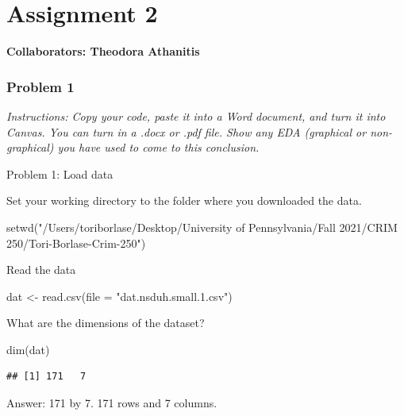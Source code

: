 \documentclass[
]{article}
\newenvironment{Shaded}{\begin{snugshade}}{\end{snugshade}}
\newcommand{\AttributeTok}[1]{\textcolor[rgb]{0.77,0.63,0.00}{#1}}
\newcommand{\FunctionTok}[1]{\textcolor[rgb]{0.00,0.00,0.00}{#1}}
\newcommand{\NormalTok}[1]{#1}
\newcommand{\OtherTok}[1]{\textcolor[rgb]{0.56,0.35,0.01}{#1}}
\newcommand{\StringTok}[1]{\textcolor[rgb]{0.31,0.60,0.02}{#1}}
\begin{document}
\hypertarget{assignment-2}{%
\section{Assignment 2}\label{assignment-2}}

\textbf{Collaborators: Theodora Athanitis}

\hypertarget{problem-1-1}{%
\subsubsection{Problem 1}\label{problem-1-1}}

\emph{Instructions: Copy your code, paste it into a Word document, and
turn it into Canvas. You can turn in a .docx or .pdf file. Show any EDA
(graphical or non-graphical) you have used to come to this conclusion.}

Problem 1: Load data

Set your working directory to the folder where you downloaded the data.

\begin{Shaded}
\begin{Highlighting}[]
\FunctionTok{setwd}\NormalTok{(}\StringTok{"/Users/toriborlase/Desktop/University of Pennsylvania/Fall 2021/CRIM 250/Tori{-}Borlase{-}Crim{-}250"}\NormalTok{)}
\end{Highlighting}
\end{Shaded}

Read the data

\begin{Shaded}
\begin{Highlighting}[]
\NormalTok{dat }\OtherTok{\textless{}{-}} \FunctionTok{read.csv}\NormalTok{(}\AttributeTok{file =} \StringTok{"dat.nsduh.small.1.csv"}\NormalTok{)}
\end{Highlighting}
\end{Shaded}

What are the dimensions of the dataset?

\begin{Shaded}
\begin{Highlighting}[]
\FunctionTok{dim}\NormalTok{(dat)}
\end{Highlighting}
\end{Shaded}

\begin{verbatim}
## [1] 171   7
\end{verbatim}

Answer: 171 by 7. 171 rows and 7 columns.
\end{document}
